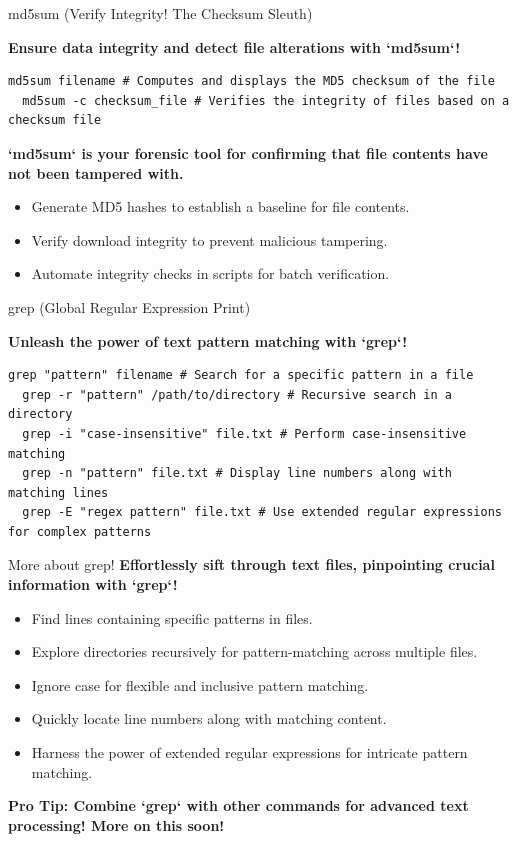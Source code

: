 \documentclass{beamer}
\begin{document}
\begin{frame}[fragile]{md5sum (Verify Integrity! The Checksum Sleuth)}

  \textbf{Ensure data integrity and detect file alterations with `md5sum`!}

  \begin{lstlisting}[frame=none]
  md5sum filename # Computes and displays the MD5 checksum of the file
  md5sum -c checksum_file # Verifies the integrity of files based on a checksum file
  \end{lstlisting}

  \textbf{`md5sum` is your forensic tool for confirming that file contents have not been tampered with.}

  \begin{itemize}
    \item Generate MD5 hashes to establish a baseline for file contents.
    \item Verify download integrity to prevent malicious tampering.
    \item Automate integrity checks in scripts for batch verification.
  \end{itemize}
\end{frame}

\begin{frame}[fragile]{grep (Global Regular Expression Print)}

  \textbf{Unleash the power of text pattern matching with `grep`!}

  \begin{lstlisting}[frame=none]
  grep "pattern" filename # Search for a specific pattern in a file
  grep -r "pattern" /path/to/directory # Recursive search in a directory
  grep -i "case-insensitive" file.txt # Perform case-insensitive matching
  grep -n "pattern" file.txt # Display line numbers along with matching lines
  grep -E "regex pattern" file.txt # Use extended regular expressions for complex patterns
  \end{lstlisting}
  
\end{frame}

\begin{frame}{More about grep!}
  \textbf{Effortlessly sift through text files, pinpointing crucial information with `grep`!}

  \begin{itemize}
    \item Find lines containing specific patterns in files.
    \item Explore directories recursively for pattern-matching across multiple files.
    \item Ignore case for flexible and inclusive pattern matching.
    \item Quickly locate line numbers along with matching content.
    \item Harness the power of extended regular expressions for intricate pattern matching.
  \end{itemize}

  \textbf{Pro Tip: Combine `grep` with other commands for advanced text processing! More on this soon!}

\end{frame}
\end{document}
